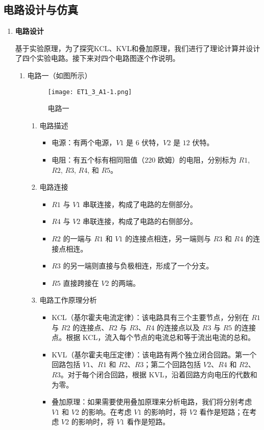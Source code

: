 \documentclass[dvipsnames, svgnames,a4paper,11pt]{article}
\begin{document}
	\subsection{电路设计与仿真}
	\begin{enumerate}
		\item \textbf{电路设计}
		
		基于实验原理，为了探究KCL、KVL和叠加原理，我们进行了理论计算并设计了四个实验电路。接下来对四个电路图逐个作说明。
		
		\begin{enumerate}
			\item 电路一（如图所示）
			
			\begin{figure}[htbp]
				\centering
				\texttt{[image: ET1\_3\_A1-1.png]}
				\caption{电路一}
				\label{fig:fig1-1}
			\end{figure}
			
			\begin{enumerate}
				\item 电路描述
				
				\begin{itemize}
					\item 电源：有两个电源，$V1$ 是 $6$ 伏特，$V2$ 是 $12$ 伏特。
					\item 电阻：有五个标有相同阻值（$220$ 欧姆）的电阻，分别标为 $R1$, $R2$, $R3$, $R4$, 和 $R5$。
				\end{itemize}
				
				\item 电路连接
				
				\begin{itemize}
					\item $R1$ 与 $V1$ 串联连接，构成了电路的左侧部分。
					\item $R4$ 与 $V2$ 串联连接，构成了电路的右侧部分。
					\item $R2$ 的一端与 $R1$ 和 $V1$ 的连接点相连，另一端则与 $R3$ 和 $R4$ 的连接点相连。
					\item $R3$ 的另一端则直接与负极相连，形成了一个分支。
					\item $R5$ 直接跨接在 $V2$ 的两端。
				\end{itemize}
				
				\item 电路工作原理分析
				
				\begin{itemize}
					\item KCL（基尔霍夫电流定律）：该电路具有三个主要节点，分别在 $R1$ 与 $R2$ 的连接点、$R2$ 与 $R3$、$R4$ 的连接点以及 $R3$ 与 $R5$ 的连接点。根据 KCL，流入每个节点的电流总和等于流出电流的总和。
					\item KVL（基尔霍夫电压定律）：该电路有两个独立闭合回路。第一个回路包括 $V1$、$R1$ 和 $R2$、$R3$；第二个回路包括 $V2$、$R4$ 和 $R2$、$R3$。对于每个闭合回路，根据 KVL，沿着回路方向电压的代数和为零。
					\item 叠加原理：如果需要使用叠加原理来分析电路，我们将分别考虑 $V1$ 和 $V2$ 的影响。在考虑 $V1$ 的影响时，将 $V2$ 看作是短路；在考虑 $V2$ 的影响时，将 $V1$ 看作是短路。
				\end{itemize}
			\end{enumerate}
			

\end{enumerate}
\end{enumerate}
\end{document}
